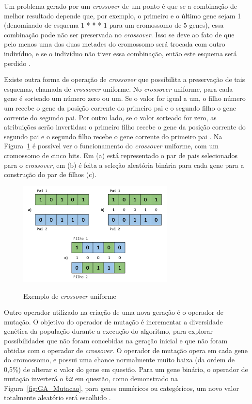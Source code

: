 \documentclass[12pt,oneside,a4paper,english,french,spanish,brazil,]{abntex2}
\begin{document}
Um problema gerado por um \textit{crossover} de um ponto é que se a combinação de melhor resultado depende que, por exemplo, o primeiro e o último gene sejam 1 (denominado de esquema 1 * * * 1 para um cromossomo de 5 genes), essa combinação pode não ser preservada no \textit{crossover}. Isso se deve ao fato de que pelo menos uma das duas metades do cromossomo será trocada com outro indivíduo, e se o indivíduo não tiver essa combinação, então este esquema será perdido \cite{linden:2008}.

Existe outra forma de operação de \textit{crossover} que possibilita a preservação de tais esquemas, chamada de \textit{crossover} uniforme. No \textit{crossover} uniforme, para cada gene é sorteado um número zero ou um. Se o valor for igual a um, o filho número um recebe o gene da posição corrente do primeiro pai e o segundo filho o gene corrente do segundo pai. Por outro lado, se o valor sorteado for zero, as atribuições serão invertidas: o primeiro filho recebe o gene da posição corrente do segundo pai e o segundo filho recebe o gene corrente do primeiro pai \cite{linden:2008}. Na Figura~\ref{fig:GA_Crossover_Uniforme} é possível ver o funcionamento do \textit{crossover} uniforme, com um cromossomo de cinco bits. Em (a) está representado o par de pais selecionados para o \textit{crossover}, em (b) é feita a seleção aleatória binária para cada gene para a construção do par de filhos (c).

\begin{figure}[ht]
\centering
\caption{Exemplo de \textit{crossover} uniforme}
\includegraphics[width=0.7\textwidth]{imagens/GA_Crossover_Uniforme.pdf}
\label{fig:GA_Crossover_Uniforme}
\end{figure}

Outro operador utilizado na criação de uma nova geração é o operador de mutação. O objetivo do operador de mutação é incrementar a diversidade genética da população durante a execução do algoritmo, para explorar possibilidades que não foram concebidas na geração inicial e que não foram obtidas com o operador de \textit{crossover}. O operador de mutação opera em cada gene do cromossomo, e possui uma chance normalmente muito baixa (da ordem de 0,5\%) de alterar o valor do gene em questão. Para um gene binário, o operador de mutação inverterá o \textit{bit} em questão, como demonstrado na Figura~\ref{fig:GA_Mutacao}, para genes numéricos ou categóricos, um novo valor totalmente aleatório será escolhido \cite{linden:2008}.
\end{document}
